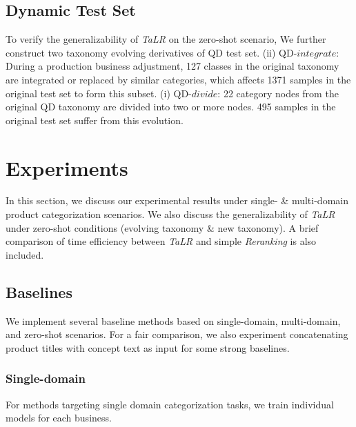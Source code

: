 \subsection{Dynamic Test Set}
To verify the generalizability of \textit{TaLR} on the zero-shot scenario, We further construct two taxonomy evolving derivatives of QD test set. 
(ii) QD-$integrate$: 
During a production business adjustment, 127 classes in the original taxonomy are integrated or replaced by similar categories, which affects 1371 samples in the original test set to form this subset. 
(i) QD-$divide$: 
22 category nodes from the original QD taxonomy are divided into two or more nodes.
495 samples in the original test set suffer from this evolution.

\section{Experiments}
In this section, 
we discuss our experimental results under single- \& multi-domain product categorization scenarios. We also discuss the generalizability of \textit{TaLR} under zero-shot conditions (evolving taxonomy  \& new taxonomy). A brief comparison of time efficiency between \textit{TaLR} and simple \textit{Reranking} is also included. 


\subsection{Baselines}
\label{sec: baseline}
We implement several baseline methods based on single-domain, multi-domain, and zero-shot scenarios.
For a fair comparison, we also experiment concatenating product titles with concept text as input for some strong baselines.
\subsubsection{Single-domain}
For methods targeting single domain categorization tasks, we train individual models for each business. 

